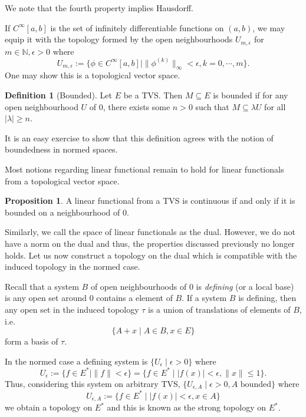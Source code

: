 \documentclass[]{article}
\theoremstyle{definition}
\theoremstyle{definition}
\newtheorem{definition}{Definition}[section]
\newtheorem{proposition}{Proposition}[section]
\begin{document}
We note that the fourth property implies Hausdorff. 

If \(C^\infty[a, b]\) is the set of infinitely differentiable functions on 
\((a, b)\), we may equip it with the topology formed by the open neighbourhoods 
\(U_{m, \epsilon}\) for \(m \in \mathbb{N}, \epsilon > 0\) where 
\[U_{m, \epsilon} := \{\phi \in C^\infty[a, b] \mid \|\phi^{(k)}\|_\infty < 
  \epsilon, k = 0, \cdots, m\}.\]
One may show this is a topological vector space.

\begin{definition}[Bounded]
  Let \(E\) be a TVS. Then \(M \subseteq E\) is bounded if for any 
  open neighbourhood \(U\) of 0, there exists some \(n > 0\) such that 
  \(M \subseteq \lambda U\) for all \(|\lambda| \ge n\).
\end{definition}

It is an easy exercise to show that this definition agrees with the notion 
of boundedness in normed spaces.

Most notions regarding linear functional remain to hold for linear functionals
from a topological vector space. 

\begin{proposition}
  A linear functional from a TVS is continuous if and only if it is bounded 
  on a neighbourhood of 0.
\end{proposition}

Similarly, we call the space of linear functionals as the dual. However, we 
do not have a norm on the dual and thus, the properties discussed previously 
no longer holds. Let us now construct a topology on the dual which is compatible 
with the induced topology in the normed case.

Recall that a system \(B\) of open neighbourhoods of 0 is \textit{defining} 
(or a local base) is any open set around 0 contains a element of \(B\). 
If a system \(B\) is defining, then any open set in the induced topology 
\(\tau\) is a union of translations of elements of \(B\), i.e. 
\[\{A + x \mid A \in B, x \in E\}\]
form a basis of \(\tau\).

In the normed case a defining system is \(\{U_\epsilon \mid \epsilon > 0\}\) where 
\[U_\epsilon := \{f \in E^* \mid \|f\| < \epsilon\}
   = \{f \in E^* \mid |f(x)| < \epsilon, \|x\| \le 1\}.\]
Thus, considering this system on arbitrary TVS, 
\(\{U_{\epsilon, A} \mid \epsilon > 0, A \text{ bounded}\}\) where
\[U_{\epsilon, A} := \{f \in E^* \mid |f(x)| < \epsilon, x \in A\}\]
we obtain a topology on \(E^*\) and this is known as the strong topology on 
\(E^*\).
\end{document}
